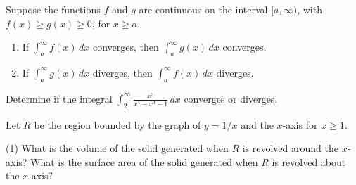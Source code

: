 \documentclass[../mathNotesPreamble]{subfiles}
\begin{document}
    \begin{thmBox*}
      Suppose the functions $f$ and $g$ are continuous on the interval $[a,\infty)$, with\newline $f(x)\geq g(x)\geq 0$, for $x\geq a$.
      \begin{enumerate}
        \item If $\displaystyle \int_a^\infty f(x)\,dx$ converges, then $\displaystyle\int_a^\infty g(x)\,dx$ converges.
        \item If $\displaystyle \int_a^\infty g(x)\,dx$ diverges, then $\displaystyle\int_a^\infty f(x)\,dx$ diverges.
      \end{enumerate}
    \end{thmBox*}

    \begin{ex*}
      Determine if the integral $\displaystyle \int_2^\infty \frac{x^3}{x^4-x^3-1}\,dx$ converges or diverges.
    \end{ex*}
    \pagebreak

  \begin{ex*}
      Let $R$ be the region bounded by the graph of $y=1/x$ and the $x$-axis for $x\geq 1$. 
    \end{ex*}
    \begin{tasks}[after-item-skip=\stretch{1}, label=, item-indent=0pt](1)
      \task What is the volume of the solid generated when $R$ is revolved around the $x$-axis?
      \task What is the surface area of the solid generated when $R$ is revolved about the $x$-axis?
    \end{tasks}
    \pagebreak
\end{document}
